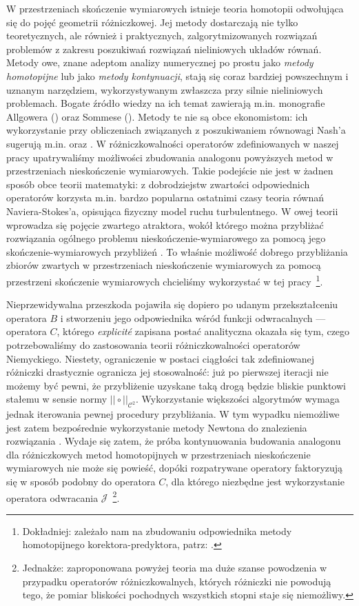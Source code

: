 W przestrzeniach skończenie wymiarowych istnieje teoria homotopii odwołująca się do pojęć geometrii różniczkowej. Jej metody dostarczają nie tylko teoretycznych, ale również i praktycznych, zalgorytmizowanych rozwiązań problemów z zakresu poszukiwań rozwiązań nieliniowych układów równań. Metody owe, znane adeptom analizy numerycznej po prostu jako {\it metody homotopijne} lub jako {\it metody kontynuacji}, stają się coraz bardziej powszechnym i uznanym narzędziem, wykorzystywanym zwłaszcza przy silnie nieliniowych problemach. Bogate źródło wiedzy na ich temat zawierają m.in. monografie Allgowera (\citeyear{Allgower_1990}) oraz Sommese (\citeyear{Sommese_2005}). Metody te nie są obce ekonomistom: ich wykorzystanie przy obliczeniach związanych z poszukiwaniem równowagi Nash'a sugerują m.in. \citet{Doraszelski_2008} oraz \citet{Judd_NME}. W różniczkowalności operatorów zdefiniowanych w naszej pracy upatrywaliśmy możliwości zbudowania analogonu powyższych metod w przestrzeniach nieskończenie wymiarowych. Takie podejście nie jest w żadnen sposób obce teorii matematyki: z dobrodziejstw zwartości odpowiednich operatorów korzysta m.in. bardzo popularna ostatnimi czasy teoria równań Naviera-Stokes'a, opisująca fizyczny model ruchu turbulentnego. W owej teorii wprowadza się pojęcie zwartego atraktora, wokół którego można przybliżać rozwiązania ogólnego problemu nieskończenie-wymiarowego za pomocą jego skończenie-wymiarowych przybliżeń \citep[patrz:][]{Foias_2004}. To właśnie możliwość dobrego przybliżania zbiorów zwartych w przestrzeniach nieskończenie wymiarowych za pomocą przestrzeni skończenie wymiarowych chcieliśmy wykorzystać w tej pracy~\footnote{Dokładniej: zależało nam na zbudowaniu odpowiednika metody homotopijnego korektora-predyktora, patrz: \citep[][rozdziały 3-9]{Allgower_1990}.}. 

	Nieprzewidywalna przeszkoda pojawiła się dopiero po udanym przekształceniu operatora $B$ i stworzeniu jego odpowiednika wśród funkcji odwracalnych --- operatora $C$, którego {\it explicit\' e} zapisana postać analityczna okazała się tym, czego potrzebowaliśmy do zastosowania teorii różniczkowalności operatorów Niemyckiego. Niestety, ograniczenie w postaci ciągłości tak zdefiniowanej różniczki drastycznie ogranicza jej stosowalność: już po pierwszej iteracji nie możemy być pewni, że przybliżenie uzyskane taką drogą będzie bliskie punktowi stałemu w sensie normy $||\circ||_{\mathcal{C}^2}$. Wykorzystanie większości algorytmów wymaga jednak iterowania pewnej procedury przybliżania. W tym wypadku niemożliwe jest zatem bezpośrednie wykorzystanie metody Newtona do znalezienia rozwiązania \citep[ogólny algorytm Newtona -- zobacz:][rozdz. 12.8.3, str. 690]{Kompedium}. Wydaje się zatem, że próba kontynuowania budowania analogonu dla różniczkowych metod homotopijnych w przestrzeniach nieskończenie wymiarowych nie może się powieść, dopóki rozpatrywane operatory faktoryzują się w sposób podobny do operatora $C$, dla którego niezbędne jest wykorzystanie operatora odwracania $\mathcal{J}$~\footnote{Jednakże: zaproponowana powyżej teoria ma duże szanse powodzenia w przypadku operatorów różniczkowalnych, których różniczki nie powodują tego, że pomiar bliskości pochodnych wszystkich stopni staje się niemożliwy.}.
	 
